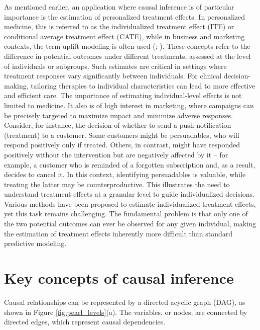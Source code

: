 As mentioned earlier, an application where causal inference is of particular importance is the estimation of personalized treatment effects. In personalized medicine, this is referred to as the individualized treatment effect (ITE) or conditional average treatment effect (CATE), while in business and marketing contexts, the term uplift modeling is often used (\citealp{gutierrez2017}; \citealp{zhao2020}). These concepts refer to the difference in potential outcomes under different treatments, assessed at the level of individuals or subgroups. Such estimates are critical in settings where treatment responses vary significantly between individuals. For clinical decision-making, tailoring therapies to individual characteristics can lead to more effective and efficient care. The importance of estimating individual-level effects is not limited to medicine. It also is of high interest in marketing, where campaigns can be precisely targeted to maximize impact and minimize adverse responses. Consider, for instance, the decision of whether to send a push notification (treatment) to a customer. Some customers might be persuadables, who will respond positively only if treated. Others, in contrast, might have responded positively without the intervention but are negatively affected by it -- for example, a customer who is reminded of a forgotten subscription and, as a result, decides to cancel it. In this context, identifying persuadables is valuable, while treating the latter may be counterproductive. This illustrates the need to understand treatment effects at a granular level to guide individualized decisions.
Various methods have been proposed to estimate individualized treatment effects, yet this task remains challenging. The fundamental problem is that only one of the two potential outcomes can ever be observed for any given individual, making the estimation of treatment effects inherently more difficult than standard predictive modeling.









\section{Key concepts of causal inference}

Causal relationships can be represented by a directed acyclic graph (DAG), as shown in Figure \ref{fig:pearl_levels}(a). The variables, or nodes, are connected by directed edges, which represent causal dependencies.

